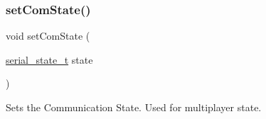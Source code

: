 \subsubsection{\texorpdfstring{set\+Com\+State()}{setComState()}}
{\footnotesize\ttfamily void set\+Com\+State (\begin{DoxyParamCaption}\item[{\hyperlink{group___input_gad2eda33b1d20e895223c0ebbb339bde8}{serial\+\_\+state\+\_\+t}}]{state }\end{DoxyParamCaption})}



Sets the Communication State. Used for multiplayer state. 

